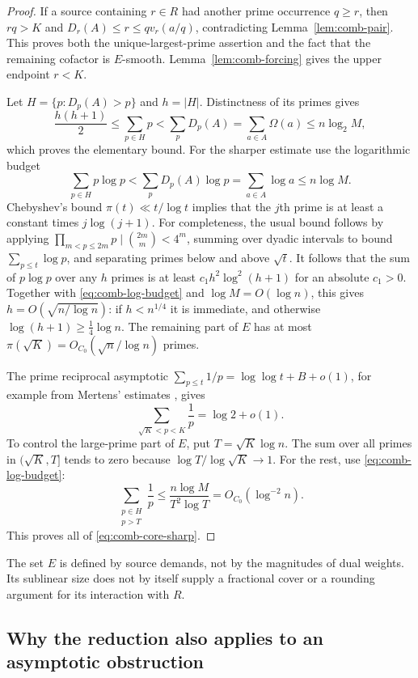\begin{proof}
If a source containing $r\in R$ had another prime occurrence
$q\ge r$, then $rq>K$ and
$D_r(A)\le r\le qv_r(a/q)$, contradicting
Lemma~\ref{lem:comb-pair}. This proves both the unique-largest-prime
assertion and the fact that the remaining cofactor is $E$-smooth.
Lemma~\ref{lem:comb-forcing} gives the upper endpoint $r<K$.

Let $H=\{p:D_p(A)>p\}$ and $h=|H|$. Distinctness of its primes gives
\[
 \frac{h(h+1)}2\le\sum_{p\in H}p
 <\sum_pD_p(A)=\sum_{a\in A}\Omega(a)\le n\log_2M,
\]
which proves the elementary bound. For the sharper estimate use
the logarithmic budget
\begin{equation}
 \sum_{p\in H}p\log p
 <\sum_pD_p(A)\log p
 =\sum_{a\in A}\log a\le n\log M.
 \label{eq:comb-log-budget}
\end{equation}
Chebyshev's bound $\pi(t)\ll t/\log t$ implies that the $j$th prime
is at least a constant times $j\log(j+1)$. For completeness, the
usual bound follows by applying
$\prod_{m<p\le2m}p\mid\binom{2m}{m}<4^m$, summing over dyadic
intervals to bound $\sum_{p\le t}\log p$, and separating primes
below and above $\sqrt t$. It follows that the sum of $p\log p$
over any $h$ primes is at least
$c_1h^2\log^2(h+1)$ for an absolute $c_1>0$.
Together with \eqref{eq:comb-log-budget} and $\log M=O(\log n)$,
this gives $h=O(\sqrt{n/\log n})$: if $h<n^{1/4}$ it is immediate,
and otherwise $\log(h+1)\ge\frac14\log n$.
The remaining part of $E$ has at most
$\pi(\sqrt K)=O_{C_0}(\sqrt n/\log n)$ primes.

The prime reciprocal asymptotic
$\sum_{p\le t}1/p=\log\log t+B+o(1)$, for example from
Mertens' estimates \cite{TaoMertens}, gives
\[
 \sum_{\sqrt K<p<K}\frac1p=\log2+o(1).
\]
To control the large-prime part of $E$, put $T=\sqrt K\log n$.
The sum over all primes in $(\sqrt K,T]$ tends to zero because
$\log T/\log\sqrt K\to1$. For the rest, use
\eqref{eq:comb-log-budget}:
\[
 \sum_{\substack{p\in H\\p>T}}\frac1p
 \le\frac{n\log M}{T^2\log T}=O_{C_0}(\log^{-2}n).
\]
This proves all of \eqref{eq:comb-core-sharp}.
\end{proof}

The set $E$ is defined by source demands, not by the magnitudes of
dual weights. Its sublinear size does not by itself supply a
fractional cover or a rounding argument for its interaction with $R$.

\subsection{Why the reduction also applies to an asymptotic obstruction}


